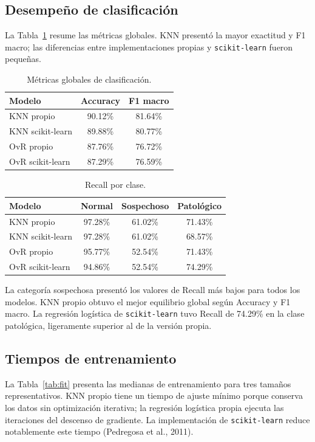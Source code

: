\documentclass[10pt,a4paper,twocolumn]{article}
\begin{document}
\subsection{Desempeño de clasificación}
La Tabla~\ref{tab:clasificacion} resume las métricas globales. KNN presentó la mayor exactitud y F1 macro; las diferencias entre implementaciones propias y \texttt{scikit-learn} fueron pequeñas.

\begin{table}[H]
\centering
\caption{Métricas globales de clasificación.}
\label{tab:clasificacion}
\small
\begin{tabular}{lcc}
\toprule
\textbf{Modelo} & \textbf{Accuracy} & \textbf{F1 macro}\\
\midrule
KNN propio & 90.12\% & 81.64\%\\
KNN scikit-learn & 89.88\% & 80.77\%\\
OvR propio & 87.76\% & 76.72\%\\
OvR scikit-learn & 87.29\% & 76.59\%\\
\bottomrule
\end{tabular}
\end{table}

\begin{table}[H]
\centering
\caption{Recall por clase.}
\label{tab:recall}
\small
\begin{tabular}{lccc}
\toprule
\textbf{Modelo} & \textbf{Normal} & \textbf{Sospechoso} & \textbf{Patológico}\\
\midrule
KNN propio & 97.28\% & 61.02\% & 71.43\%\\
KNN scikit-learn & 97.28\% & 61.02\% & 68.57\%\\
OvR propio & 95.77\% & 52.54\% & 71.43\%\\
OvR scikit-learn & 94.86\% & 52.54\% & 74.29\%\\
\bottomrule
\end{tabular}
\end{table}

La categoría sospechosa presentó los valores de Recall más bajos para todos los modelos. KNN propio obtuvo el mejor equilibrio global según Accuracy y F1 macro. La regresión logística de \texttt{scikit-learn} tuvo Recall de 74.29\% en la clase patológica, ligeramente superior al de la versión propia.

\subsection{Tiempos de entrenamiento}
La Tabla~\ref{tab:fit} presenta las medianas de entrenamiento para tres tamaños representativos. KNN propio tiene un tiempo de ajuste mínimo porque conserva los datos sin optimización iterativa; la regresión logística propia ejecuta las iteraciones del descenso de gradiente. La implementación de \texttt{scikit-learn} reduce notablemente este tiempo (Pedregosa et al., 2011).
\end{document}
